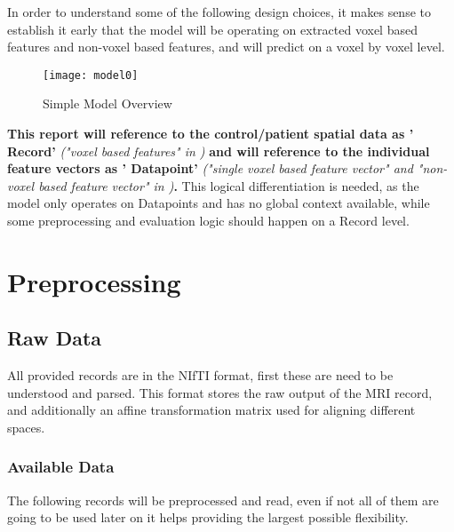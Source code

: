In order to understand some of the following design choices, it makes sense to establish it early that the model will be operating on extracted voxel based features and non-voxel based features, and will predict on a voxel by voxel level.

\begin{figure}[H]
\centering
\texttt{[image: model0]}
\caption{Simple Model Overview}
\label{fig:model0}
\end{figure}

\textbf{This report will reference to the control/patient spatial data as '{\color{red} Record}'} \emph{("voxel based features" in )} \textbf{and will reference to the individual feature vectors as '{\color{red} Datapoint}'} \emph{("single voxel based feature vector" and "non-voxel based feature vector" in )}\textbf{.} This logical differentiation is needed, as the model only operates on Datapoints and has no global context available, while some preprocessing and evaluation logic should happen on a Record level.

\section{Preprocessing}
\label{sec:preproc}

\subsection{Raw Data}
All provided records are in the \ac{NIfTI} format, first these are need to be understood and parsed. This format stores the raw output of the \ac{MRI} record, and additionally an affine transformation matrix used for aligning different spaces.

\subsubsection{Available Data}
The following records will be preprocessed and read, even if not all of them are going to be used later on it helps providing the largest possible flexibility.

